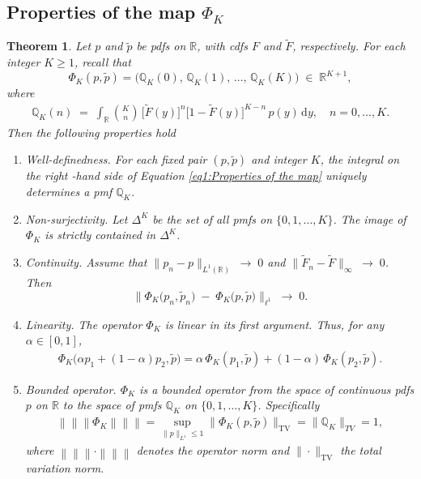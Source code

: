 \documentclass{article}
\newcommand{\triplenorm}[1]{%
  \left\lVert\!\!\left\lVert\!\!\left\lVert #1 
  \right\rVert\!\!\right\rVert\!\!\right\rVert
}
\newtheorem{theorem}{Theorem}[section]
\begin{document}
\subsection{Properties of the map \(\Phi_{K}\)}
\begin{theorem}
\label{thm:PhiK_Properties}
Let $p$ and $\tilde{p}$ be pdfs on $\mathbb{R}$, with cdfs $F$ and $\tilde{F}$, respectively. For each integer $K \ge 1$, recall that 
\[
\Phi_K(p,\tilde p)
=\bigl(\mathbb{Q}_K(0),\,\mathbb{Q}_K(1),\,\dots,\,\mathbb{Q}_K(K)\bigr)
\;\in\;\mathbb{R}^{K+1},
\]
where
\begin{align}\label{eq1:Properties of the map}
\mathbb{Q}_K(n)
\;=\;
\int_{\mathbb{R}}
\binom{K}{n}\,
\bigl[\tilde{F}(y)\bigr]^n
\bigl[1-\tilde{F}(y)\bigr]^{K-n}
\,p(y)\,\mathrm{d}y,
\quad n=0,\ldots,K.
\end{align}
Then the following properties hold
\begin{enumerate}[label=(\roman*)]
    \item \emph{Well-definedness}.
    For each fixed pair \((p,\tilde{p})\) and integer \(K\), the integral on the right -hand side of Equation \ref{eq1:Properties of the map} uniquely determines a pmf \(\mathbb{Q}_{K}\).

    \item \emph{Non-surjectivity}.
    Let $\Delta^K$ be the set of all pmfs on $\{0,1,\ldots,K\}$. The image of $\Phi_{K}$ is strictly contained in $\Delta^K$.

    \item \emph{Continuity}.
    Assume that $\|p_n - p\|_{L^1(\mathbb{R})}\;\rightarrow\;0$
    and $\|\tilde F_n - \tilde F\|_{\infty}\;\rightarrow\;0$.
    Then
    \[
    \bigl\|\Phi_K\bigl(p_n,\tilde p_n\bigr)\;-\;\Phi_K\bigl(p,\tilde p\bigr)\bigr\|_{\ell^1}
    \;\longrightarrow\;0.
    \]

    \item \emph{Linearity}. The operator $\Phi_{K}$ is linear in its first argument. Thus, for any $\alpha \in [0,1]$,
    \begin{align*}
    \Phi_{K}\big(\alpha p_{1} + (1 - \alpha) p_{2}, \tilde{p}\big) = \alpha\, \Phi_{K}(p_{1}, \tilde{p}) + (1 - \alpha)\, \Phi_{K}(p_{2}, \tilde{p}).
    \end{align*}

    \item \emph{Bounded operator}. $\Phi_{K}$ is a bounded operator from the space of continuous pdfs \( p \) on \( \mathbb{R} \) to the space of pmfs \( \mathbb{Q}_K \) on \( \{0, 1, \ldots, K\} \). Specifically
    \begin{align*}
    \triplenorm{\Phi_{K}} = \sup_{\|p\|_{L^{1}}\leq 1}\|\Phi_{K}(p, \tilde{p})\|_{\text{TV}} = \|\mathbb{Q}_{K}\|_{TV}=1,
    \end{align*}
    where $\triplenorm{\cdot}$ denotes the operator norm and $\|\cdot\|_{\text{TV}}$ the total variation norm.
\end{enumerate}
\end{theorem}
\end{document}
